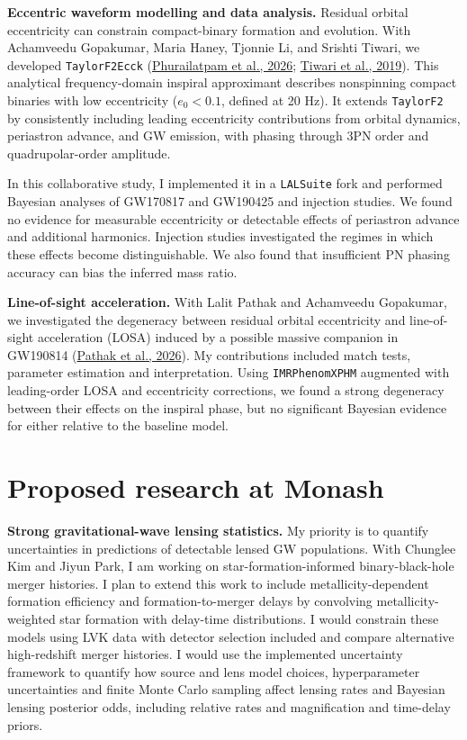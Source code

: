 \documentclass[11pt]{article}
\begin{document}
\textbf{Eccentric waveform modelling and data analysis.} Residual orbital eccentricity can constrain compact-binary formation and evolution. With Achamveedu Gopakumar, Maria Haney, Tjonnie Li, and Srishti Tiwari, we developed \texttt{TaylorF2Ecck} (\href{https://doi.org/10.1103/94fx-wnjx}{Phurailatpam et al., 2026}; \href{https://doi.org/10.1103/PhysRevD.99.124008}{Tiwari et al., 2019}). This analytical frequency-domain inspiral approximant describes nonspinning compact binaries with low eccentricity ($e_0<0.1$, defined at 20 Hz). It extends \texttt{TaylorF2} by consistently including leading eccentricity contributions from orbital dynamics, periastron advance, and GW emission, with phasing through 3PN order and quadrupolar-order amplitude.

In this collaborative study, I implemented it in a \texttt{LALSuite} fork and performed Bayesian analyses of GW170817 and GW190425 and injection studies. We found no evidence for measurable eccentricity or detectable effects of periastron advance and additional harmonics. Injection studies investigated the regimes in which these effects become distinguishable. We also found that insufficient PN phasing accuracy can bias the inferred mass ratio.

\textbf{Line-of-sight acceleration.} With Lalit Pathak and Achamveedu Gopakumar, we investigated the degeneracy between residual orbital eccentricity and line-of-sight acceleration (LOSA) induced by a possible massive companion in GW190814 (\href{https://doi.org/10.3847/1538-4357/ae9cae}{Pathak et al., 2026}). My contributions included match tests, parameter estimation and interpretation. Using \texttt{IMRPhenomXPHM} augmented with leading-order LOSA and eccentricity corrections, we found a strong degeneracy between their effects on the inspiral phase, but no significant Bayesian evidence for either relative to the baseline model.

\newpage
\section*{Proposed research at Monash}

\textbf{Strong gravitational-wave lensing statistics.} My priority is to quantify uncertainties in predictions of detectable lensed GW populations. With Chunglee Kim and Jiyun Park, I am working on star-formation-informed binary-black-hole merger histories. I plan to extend this work to include metallicity-dependent formation efficiency and formation-to-merger delays by convolving metallicity-weighted star formation with delay-time distributions. I would constrain these models using LVK data with detector selection included and compare alternative high-redshift merger histories. I would use the implemented uncertainty framework to quantify how source and lens model choices, hyperparameter uncertainties and finite Monte Carlo sampling affect lensing rates and Bayesian lensing posterior odds, including relative rates and magnification and time-delay priors.
\end{document}
